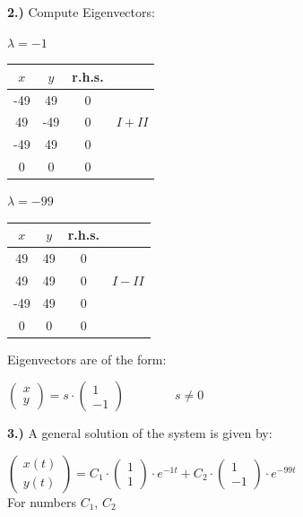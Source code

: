 \documentclass[a4paper,12pt]{report}
\begin{document}
	\noindent \textbf{2.)} Compute Eigenvectors:
	\begin{center}
		$\lambda = -1 $ \\
		\bigskip
		\begin{tabular}{c c | c l}
		$x$ & $y$ & r.h.s. \\
		\hline
		-49 & 49 & 0 &\\
		49 & -49 & 0 & $I + II$\\
		\hline
		-49 & 49 & 0&\\
		0 & 0 & 0 &
		\end{tabular}
		
		\bigskip
		\bigskip
		
		
		
		$\lambda = -99$\\
		\bigskip
		\begin{tabular}{c c | c l}
		$x$ & $y$ & r.h.s. \\
		\hline
		49 & 49 & 0 &\\
		49 & 49 & 0 & $I - II$\\
		\hline
		-49 & 49 & 0&\\
		0 & 0 & 0 &
		\end{tabular}
	\end{center}
	
	\bigskip
	\bigskip
	
	Eigenvectors are of the form:
	
	\begin{center}
		$
		\begin{pmatrix}
			x\\
			y
		\end{pmatrix}
			= s \cdot
		\begin{pmatrix}
			1 \\
			-1
		\end{pmatrix}
		\qquad \qquad s \neq 0
		$
	\end{center}
	
	\bigskip
	\bigskip
	
	\noindent \textbf{3.)} A general solution of the system is given by:\\
		\begin{center}
		$
		\begin{pmatrix}
			x(t)\\
			y(t)
		\end{pmatrix}
			= C_1 \cdot
		\begin{pmatrix}
			1 \\
			1
		\end{pmatrix}
			\cdot e^{-1t} + C_2 \cdot
		\begin{pmatrix}
			1 \\
			-1
		\end{pmatrix}
			\cdot e^{-99t}
		$\\
		\medskip
		For numbers $C_1$, $C_2$
	\end{center}
	
\end{document}
